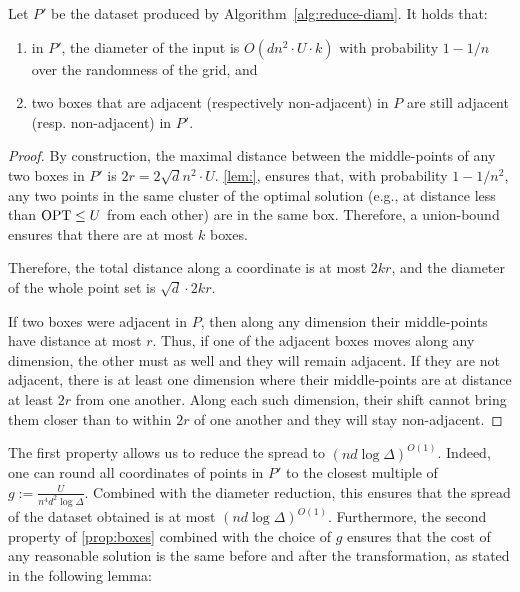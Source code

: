 \begin{proposition}\label{prop:boxes}
    Let $P'$ be the dataset produced by Algorithm~\ref{alg:reduce-diam}. It holds that:
    \begin{enumerate}
        \item in $P'$, the diameter of the input is $O(d n^2\cdot U \cdot k)$ with probability $1-1/n$ over the randomness of the grid, and
        \item two boxes that are adjacent (respectively non-adjacent) in $P$ are still adjacent (resp. non-adjacent) in $P'$.
    \end{enumerate}
\end{proposition}
\begin{proof}

By construction, the maximal distance between the middle-points of any two boxes in $P'$ is $2r = 2\sqrt d n^2\cdot U$. \cref{lem:}, ensures that, with probability $1-1/n^2$, any two points in the same cluster of the optimal solution (e.g., at distance less than $\text{OPT} \leq U$ from each other) are in the same box. Therefore, a union-bound ensures that there are at most $k$ boxes.

Therefore, the total distance along a coordinate is at most $2kr$, and the diameter of the whole point set is $\sqrt{d} \cdot 2kr$.

If two boxes were adjacent in $P$, then along any dimension their middle-points have distance at most $r$. Thus, if one of the adjacent boxes moves along any dimension, the other must as well and they will remain
adjacent.
If they are not adjacent, there is at least one dimension where their middle-points are at distance at least $2r$ from one another. Along each such dimension,
their shift cannot bring them closer than to within $2r$ of one another and they will stay non-adjacent.

\end{proof}

The first property allows us to reduce the spread to $(nd \log \Delta)^{O(1)}$.  Indeed, one can round all coordinates of points in $P'$ to the closest multiple
of $g := \frac{U}{n^4 d^{2} \log \Delta}$.  Combined with the diameter reduction, this ensures that the spread of the dataset obtained is at most $(nd \log
\Delta)^{O(1)}$.  Furthermore, the second property of \cref{prop:boxes} combined with the choice of $g$ ensures that the cost of any reasonable solution is the
same before and after the transformation, as stated in the following lemma:

